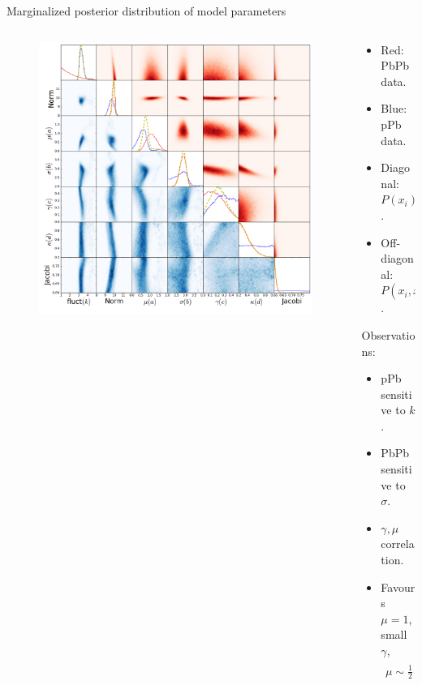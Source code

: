 \documentclass[11pt]{beamer}
\begin{document}
\begin{frame}{Marginalized posterior distribution of model parameters}
\begin{columns}
\begin{column}{0.6\textwidth}
\begin{figure}
\begin{center}
\includegraphics[width = \textwidth]{./pics/corner.png}
\end{center}
\end{figure}
\end{column}
\begin{column}{0.4\textwidth}
\begin{itemize}
\item Red: PbPb data.
\item Blue: pPb data.
\item Diagonal: $P(x_i)$. 
\item Off-diagonal: $P(x_i, x_j)$.
\end{itemize}
Observations:
\begin{itemize}
\item pPb sensitive to $k$.
\item PbPb sensitive to $\sigma$.
\item $\gamma, \mu$ correlation. 
\item Favours $\mu = 1$, small $\gamma$,
\begin{eqnarray}
\mu \sim \frac{1}{2}\ln(\frac{T_A}{T_B}).
\end{eqnarray}
\end{itemize}
\end{column}
\end{columns}
\end{frame}
\end{document}
